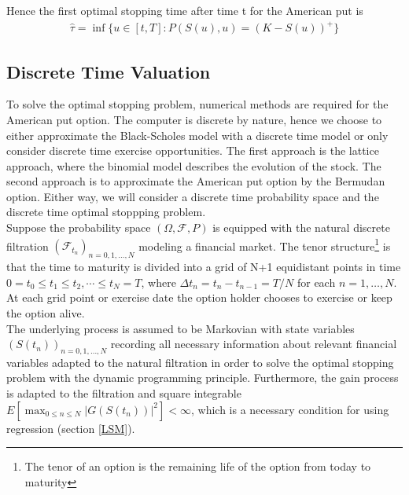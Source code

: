 Hence the first optimal stopping time after time t for the American put is
\begin{equation*}
\begin{split}
\hat{\tau}= \inf\{u \in [t,T] : P(S(u),u) = (K-S(u))^+ \}
\end{split}
\end{equation*}

\subsection{Discrete Time Valuation}\label{DiscreteValueFramework}
To solve the optimal stopping problem, numerical methods are required for the American put option. The computer is discrete by nature, hence we choose to either approximate the Black-Scholes model with a discrete time model or only consider discrete time exercise opportunities. The first approach is the lattice approach, where the binomial model describes the evolution of the stock. The second approach is to approximate the American put option by the Bermudan option. Either way, we will consider a discrete time probability space and the discrete time optimal stoppping problem.\\

Suppose the probability space $(\Omega, \mathcal{F}, P)$ is equipped with the natural discrete filtration $(\mathcal{F}_{t_n})_{n=0,1,\ldots,N}$ modeling a financial market. The tenor structure\footnote{The tenor of an option is the remaining life of the option from today to maturity} is that the time to maturity is divided into a grid of N+1 equidistant points in time $0=t_0\leq t_1\leq t_2, \cdots \leq t_N=T$, where $\Delta t_n = t_n-t_{n-1}=T/N$ for each $n=1, \ldots, N$. At each grid point or exercise date the option holder chooses to exercise or keep the option alive. \\

The underlying process is assumed to be Markovian with state variables $(S(t_n))_{n=0,1,\ldots,N}$ recording all necessary information about relevant financial variables adapted to the natural filtration in order to solve the optimal stopping problem with the dynamic programming principle. Furthermore, the gain process is adapted to the filtration and square integrable $E[\max_{0\leq n \leq N} |G(S(t_n))|^2]<\infty$, which is a necessary condition for using regression (section \ref{LSM}).\\

